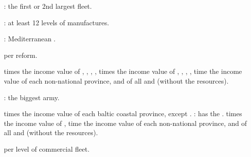 \aparag[Military.]
 \VPs: the first or 2nd largest fleet.

\aparag[Industry.]
 \VPs: at least 12 levels of manufactures.

\aparag[Trade.]
 \VPs: Mediterranean .

\aparag[Reforms.]
 \VPs per reform.

\aparag[Territory.]
 times the income value of ,
, ,
, 
 times the income value of ,
, , ,
 time the income value of each non-national province, and of
all \COL and \TP (without the resources).

\aparag[Military.]
 \VPs: the biggest army.

\aparag[Territory.]
 times the income value of each baltic coastal province, except
.
 \VPs: \paysmajeurSuede has the .
 times the income value of ,
 time the income value of each non-national province, and of
all \COL and \TP (without the resources).

\aparag[Trade.]
 \VP per level of commercial fleet.







